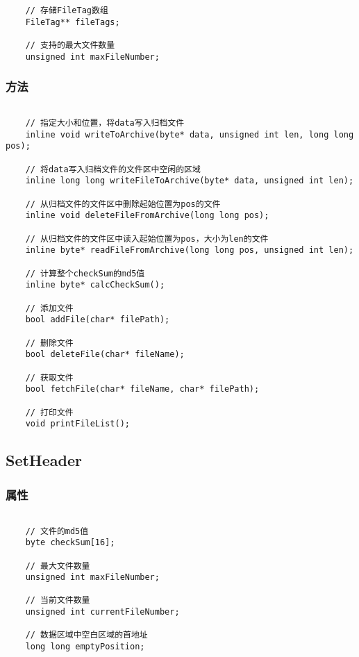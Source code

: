 \documentclass[11pt, a4paper]{book}
\begin{document}
\begin{CJK*}{UTF8}{gbsn}
\begin{lstlisting}
    // 存储FileTag数组
    FileTag** fileTags;

    // 支持的最大文件数量
    unsigned int maxFileNumber;
  \end{lstlisting}

  \subsubsection{方法}
  \begin{lstlisting}

    // 指定大小和位置，将data写入归档文件
    inline void writeToArchive(byte* data, unsigned int len, long long pos);

    // 将data写入归档文件的文件区中空闲的区域
    inline long long writeFileToArchive(byte* data, unsigned int len);

    // 从归档文件的文件区中删除起始位置为pos的文件
    inline void deleteFileFromArchive(long long pos);

    // 从归档文件的文件区中读入起始位置为pos，大小为len的文件
    inline byte* readFileFromArchive(long long pos, unsigned int len);

    // 计算整个checkSum的md5值
    inline byte* calcCheckSum();

    // 添加文件
    bool addFile(char* filePath);

    // 删除文件
    bool deleteFile(char* fileName);

    // 获取文件
    bool fetchFile(char* fileName, char* filePath);

    // 打印文件
    void printFileList(); 

  \end{lstlisting}

  \subsection{SetHeader}

  \subsubsection{属性}

  \begin{lstlisting}
    
    // 文件的md5值
    byte checkSum[16];

    // 最大文件数量
    unsigned int maxFileNumber;

    // 当前文件数量
    unsigned int currentFileNumber;

    // 数据区域中空白区域的首地址
    long long emptyPosition;


\end{lstlisting}
\end{CJK*}
\end{document}
